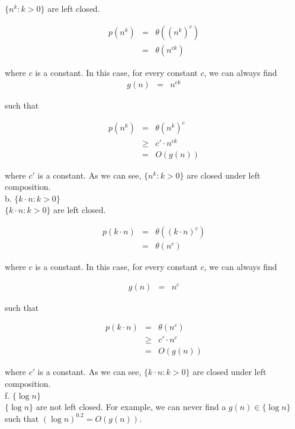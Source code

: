 \documentclass[12pt]{article}
\begin{document}
$\{n^k : k > 0 \}$ are left closed.

\begin{eqnarray*}
  p(n^k) &=& \theta {((n^k)^c)} \\
  &=& \theta {(n^{ck})}
\end{eqnarray*}

where $c$ is a constant. In this case, for every constant $c$, we can
always find
\begin{eqnarray*}
  g(n) &=& n^{ck}
\end{eqnarray*}

such that

\begin{eqnarray*}
  p(n^k) &=& \theta {(n^k)^c} \\
  &\ge& c' \cdot n^{ck} \\
  &=& O(g(n))
\end{eqnarray*}

where $c'$ is a constant. As we can see, $\{ n^k : k > 0 \}$ are
closed under left composition. \\

b. $\{ k \cdot n : k > 0 \}$ \\

$\{ k \cdot n : k > 0 \}$ are left closed.

\begin{eqnarray*}
  p(k \cdot n) &=& \theta {((k \cdot n)^c)} \\
  &=& \theta {(n^c)}
\end{eqnarray*}

where $c$ is a constant. In this case, for every constant $c$, we can
always find

\begin{eqnarray*}
  g(n) &=& n^c
\end{eqnarray*}

such that 

\begin{eqnarray*}
  p(k \cdot n) &=& \theta {(n^c)} \\
  &\ge& c' \cdot n^c \\
  &=& O(g(n))
\end{eqnarray*}

where $c'$ is a constant. As we can see, $\{ k \cdot n : k > 0 \}$ are
closed under left composition. \\

f. $\{\log {n} \}$ \\

$\{\log {n} \}$ are not left closed. For example, we can never find a
$g(n) \in \{\log {n} \}$ such that $(\log {n})^{0.2} = O(g(n))$. \\
\end{document}
